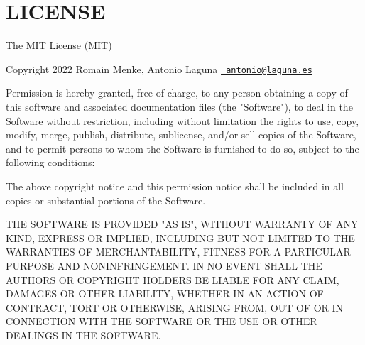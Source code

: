\chapter{LICENSE}
\hypertarget{md_node__modules_2_0dcsstools_2css-tokenizer_2_l_i_c_e_n_s_e}{}\label{md_node__modules_2_0dcsstools_2css-tokenizer_2_l_i_c_e_n_s_e}
The MIT License (MIT)

Copyright 2022 Romain Menke, Antonio Laguna \href{mailto:antonio@laguna.es}{\texttt{ antonio@laguna.\+es}}

Permission is hereby granted, free of charge, to any person obtaining a copy of this software and associated documentation files (the "{}\+Software"{}), to deal in the Software without restriction, including without limitation the rights to use, copy, modify, merge, publish, distribute, sublicense, and/or sell copies of the Software, and to permit persons to whom the Software is furnished to do so, subject to the following conditions\+:

The above copyright notice and this permission notice shall be included in all copies or substantial portions of the Software.

THE SOFTWARE IS PROVIDED "{}\+AS IS"{}, WITHOUT WARRANTY OF ANY KIND, EXPRESS OR IMPLIED, INCLUDING BUT NOT LIMITED TO THE WARRANTIES OF MERCHANTABILITY, FITNESS FOR A PARTICULAR PURPOSE AND NONINFRINGEMENT. IN NO EVENT SHALL THE AUTHORS OR COPYRIGHT HOLDERS BE LIABLE FOR ANY CLAIM, DAMAGES OR OTHER LIABILITY, WHETHER IN AN ACTION OF CONTRACT, TORT OR OTHERWISE, ARISING FROM, OUT OF OR IN CONNECTION WITH THE SOFTWARE OR THE USE OR OTHER DEALINGS IN THE SOFTWARE. 